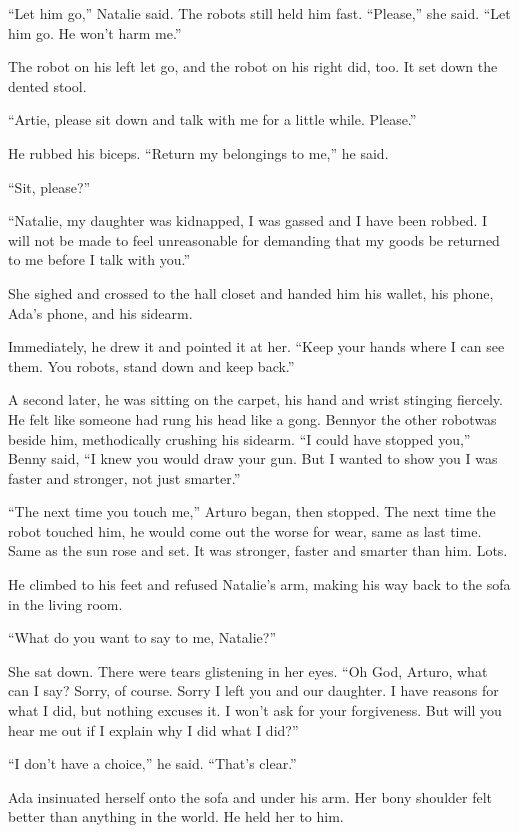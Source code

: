 “Let him go,” Natalie said. The robots still held him fast.
“Please,” she said. “Let him go. He won’t harm me.”

The robot on his left let go, and the robot on his right did, too.
It set down the dented stool.

“Artie, please sit down and talk with me for a little while.
Please.”

He rubbed his biceps. “Return my belongings to me,” he said.

“Sit, please?”

“Natalie, my daughter was kidnapped, I was gassed and I have been
robbed. I will not be made to feel unreasonable for demanding that
my goods be returned to me before I talk with you.”

She sighed and crossed to the hall closet and handed him his
wallet, his phone, Ada’s phone, and his sidearm.

Immediately, he drew it and pointed it at her. “Keep your hands
where I can see them. You robots, stand down and keep back.”

A second later, he was sitting on the carpet, his hand and wrist
stinging fiercely. He felt like someone had rung his head like a
gong. Benny{\dash}or the other robot{\dash}was beside him, methodically
crushing his sidearm. “I could have stopped you,” Benny said, “I
knew you would draw your gun. But I wanted to show you I was faster
and stronger, not just smarter.”

“The next time you touch me,” Arturo began, then stopped. The next
time the robot touched him, he would come out the worse for wear,
same as last time. Same as the sun rose and set. It was stronger,
faster and smarter than him. Lots.

He climbed to his feet and refused Natalie’s arm, making his way
back to the sofa in the living room.

“What do you want to say to me, Natalie?”

She sat down. There were tears glistening in her eyes. “Oh God,
Arturo, what can I say? Sorry, of course. Sorry I left you and our
daughter. I have reasons for what I did, but nothing excuses it. I
won’t ask for your forgiveness. But will you hear me out if I
explain why I did what I did?”

“I don’t have a choice,” he said. “That’s clear.”

Ada insinuated herself onto the sofa and under his arm. Her bony
shoulder felt better than anything in the world. He held her to
him.


